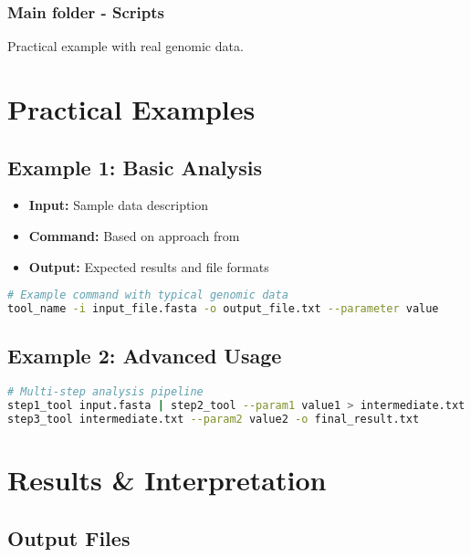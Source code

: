 \documentclass[a4paper,11pt]{article}
\begin{document}
\subsubsection{Main folder - Scripts}
\begin{example}
Practical example with real genomic data.
\end{example}

\section{Practical Examples}

\subsection{Example 1: Basic Analysis}

\begin{itemize}
    \item \textbf{Input:} Sample data description
    \item \textbf{Command:} Based on approach from \cite{example2024}
    \item \textbf{Output:} Expected results and file formats
\end{itemize}

\begin{lstlisting}[language=bash, caption=Basic command example]
# Example command with typical genomic data
tool_name -i input_file.fasta -o output_file.txt --parameter value
\end{lstlisting}

\subsection{Example 2: Advanced Usage}

\begin{lstlisting}[language=bash, caption=Advanced analysis pipeline]
# Multi-step analysis pipeline
step1_tool input.fasta | step2_tool --param1 value1 > intermediate.txt
step3_tool intermediate.txt --param2 value2 -o final_result.txt
\end{lstlisting}

\section{Results \& Interpretation}

\subsection{Output Files}
\end{document}
